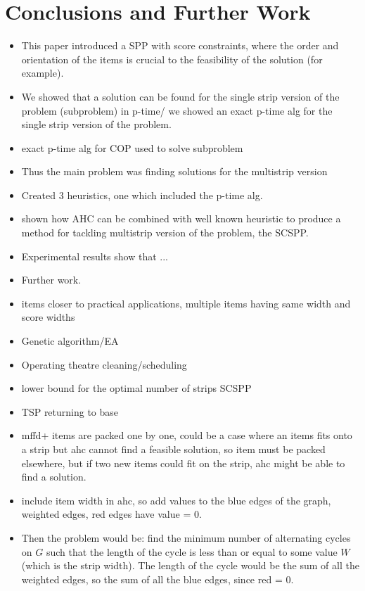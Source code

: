 \documentclass[runningheads]{llncs}
\begin{document}
\section{Conclusions and Further Work}
\begin{itemize}
	\item This paper introduced a SPP with score constraints, where the order and orientation of the items is crucial to the feasibility of the solution (for example).
	\item We showed that a solution can be found for the single strip version of the problem (subproblem) in p-time/ we showed an exact p-time alg for the single strip version of the problem. 
	\item exact p-time alg for COP used to solve subproblem
	\item Thus the main problem was finding solutions for the multistrip version
	\item Created 3 heuristics, one which included the p-time alg. 
	\item shown how AHC can be combined with well known heuristic to produce a method for tackling multistrip version of the problem, the SCSPP.
	\item Experimental results show that ...
	\item Further work.
	\item items closer to practical applications, multiple items having same width and score widths
	\item Genetic algorithm/EA
	\item Operating theatre cleaning/scheduling
	\item lower bound for the optimal number of strips SCSPP
	\item \cite{miller1960} TSP returning to base
	\item mffd+ items are packed one by one, could be a case where an items fits onto a strip but ahc cannot find a feasible solution, so item must be packed elsewhere, but if two new items could fit on the strip, ahc might be able to find a solution. 
	\item include item width in ahc, so add values to the blue edges of the graph, weighted edges, red edges have value = 0.
	\item Then the problem would be: find the minimum number of alternating cycles on $G$ such that the length of the cycle is less than or equal to some value $W$ (which is the strip width). The length of the cycle would be the sum of all the weighted edges, so the sum of all the blue edges, since red = 0. 

\end{itemize}
\end{document}
